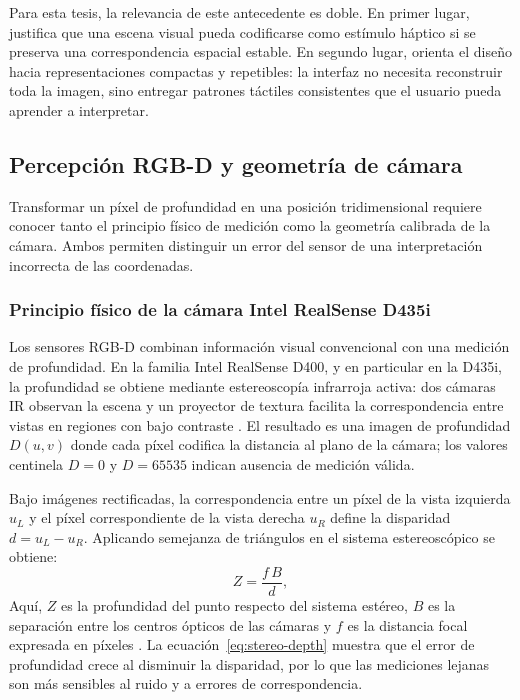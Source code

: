 Para esta tesis, la relevancia de este antecedente es doble. En primer lugar, justifica que
una escena visual pueda codificarse como estímulo háptico si se preserva una correspondencia
espacial estable. En segundo lugar, orienta el diseño hacia representaciones compactas y
repetibles: la interfaz no necesita reconstruir toda la imagen, sino entregar patrones
táctiles consistentes que el usuario pueda aprender a interpretar.

\subsection{Percepción RGB-D y geometría de cámara}
\label{sec:mt-rgbd}

Transformar un píxel de profundidad en una posición tridimensional requiere conocer tanto el
principio físico de medición como la geometría calibrada de la cámara. Ambos permiten distinguir
un error del sensor de una interpretación incorrecta de las coordenadas.

\subsubsection{Principio físico de la cámara Intel RealSense D435i}

Los sensores RGB-D combinan información visual convencional con una medición de profundidad.
En la familia Intel RealSense D400, y en particular en la D435i, la profundidad se obtiene
mediante estereoscopía infrarroja activa: dos cámaras IR observan la escena y un proyector de
textura facilita la correspondencia entre vistas en regiones con bajo contraste
\cite{RS-D400,IntelRealSenseDepthTuning}. El resultado es una imagen de profundidad $D(u,v)$ donde
cada píxel codifica la distancia al plano de la cámara; los valores centinela $D=0$ y
$D=65535$ indican ausencia de medición válida.

Bajo imágenes rectificadas, la correspondencia entre un píxel de la vista izquierda $u_L$ y
el píxel correspondiente de la vista derecha $u_R$ define la disparidad $d=u_L-u_R$. Aplicando
semejanza de triángulos en el sistema estereoscópico se obtiene:
\begin{equation}
  Z = \frac{f\,B}{d},
  \label{eq:stereo-depth}
\end{equation}
Aquí, $Z$ es la profundidad del punto respecto del sistema estéreo, $B$ es la separación
entre los centros ópticos de las cámaras y $f$ es la distancia focal expresada en píxeles
\cite{Hartley2004,Scharstein2002}. La ecuación~\ref{eq:stereo-depth} muestra que el error de
profundidad crece al disminuir la disparidad, por lo que las mediciones lejanas son más
sensibles al ruido y a errores de correspondencia.

